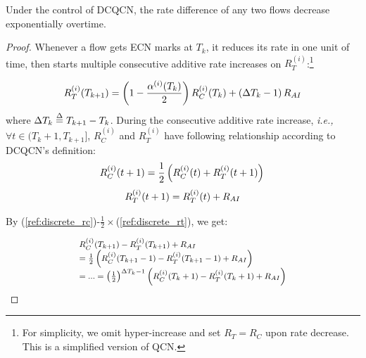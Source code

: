 \begin{thm}
Under the control of DCQCN, the rate difference of any two flows decrease exponentially
overtime. 
\end{thm}
\begin{proof}
Whenever a flow gets ECN marks at $T_k$, it reduces its
rate in one unit of time, then starts multiple consecutive additive rate
increases on $R_T^{(i)}$:\footnote{For simplicity, we omit hyper-increase and set 
$R_T = R_C$ upon rate decrease. This is a simplified version of QCN.}

\begin{equation}
\small
R_T^{(i)}({T_{k + 1}}) = \left( {1 - \frac{{{\alpha ^{(i)}}({T_k})}}{2}} \right)R_C^{(i)}({T_k}) + \left( {\Delta {T_k} - 1} \right){R_{AI}}
\label{eq:converge_rc}
\end{equation}
where $\Delta {T_k} \buildrel \Delta \over = {T_{k + 1}} - {T_k}$. During the consecutive 
additive rate increase, {\em i.e.,} $\forall t \in ({T_k} + 1,{T_{k + 1}}]$, $R_C^{(i)}$ and $R_T^{(i)}$ 
have following relationship according to DCQCN's definition:
\begin{equation}
\small
R_C^{(i)}(t + 1) = \frac{1}{2}\left( {R_C^{(i)}(t) + R_T^{(i)}(t + 1)} \right)\\
\label{ref:discrete_rc}
\end{equation}
\begin{equation}
\small
R_T^{(i)}(t + 1) = R_T^{(i)}(t) + {R_{AI}}
\label{ref:discrete_rt}
\end{equation}

By (\ref{ref:discrete_rc})-$\frac{1}{2}\times$(\ref{ref:discrete_rt}), we get:

\begin{equation}
\small
\begin{array}{l}
R_C^{(i)}(T_{k + 1}) - R_T^{(i)}(T_{k + 1}) + {R_{AI}}\\
 = \frac{1}{2}\left( {R_C^{(i)}(T_{k + 1} - 1) - R_T^{(i)}(T_{k + 1} - 1) + {R_{AI}}} \right)\\
 = ... = {\left( {\frac{1}{2}} \right)^{\Delta {T_k}-1}}\left( {R_C^{(i)}({T_k} + 1) - R_T^{(i)}({T_k} + 1) + {R_{AI}}} \right)
\end{array}
\end{equation}


\end{proof}
